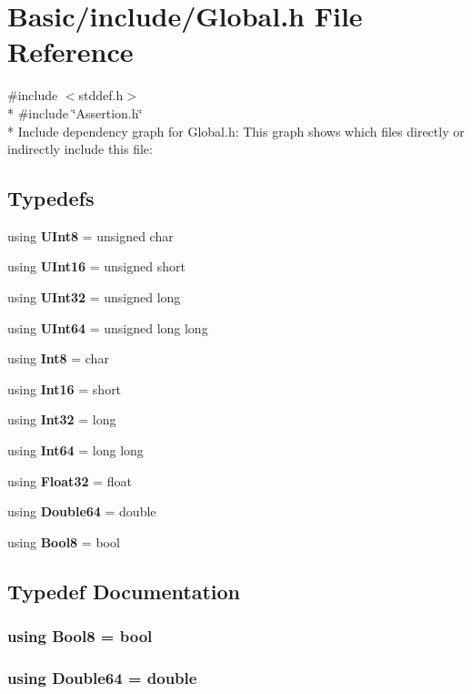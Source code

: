 \section{Basic/include/\-Global.h File Reference}
\label{Global_8h}
{\ttfamily \#include $<$stddef.\-h$>$}\\*
{\ttfamily \#include \char`\"{}Assertion.\-h\char`\"{}}\\*
Include dependency graph for Global.\-h\-:
This graph shows which files directly or indirectly include this file\-:
\subsection*{Typedefs}
\begin{DoxyCompactItemize}
\item 
using {\bf U\-Int8} = unsigned char
\item 
using {\bf U\-Int16} = unsigned short
\item 
using {\bf U\-Int32} = unsigned long
\item 
using {\bf U\-Int64} = unsigned long long
\item 
using {\bf Int8} = char
\item 
using {\bf Int16} = short
\item 
using {\bf Int32} = long
\item 
using {\bf Int64} = long long
\item 
using {\bf Float32} = float
\item 
using {\bf Double64} = double
\item 
using {\bf Bool8} = bool
\end{DoxyCompactItemize}


\subsection{Typedef Documentation}
\subsubsection[{Bool8}]{\setlength{\rightskip}{0pt plus 5cm}using {\bf Bool8} =  bool}\label{Global_8h_ae71b961eb12958963c4585df9bbcc9bf}
\subsubsection[{Double64}]{\setlength{\rightskip}{0pt plus 5cm}using {\bf Double64} =  double}\label{Global_8h_a8590993f0c785f7cb83c92aadcadbea5}
